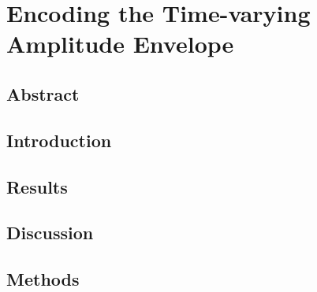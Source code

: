 \chapter{Encoding the Time-varying Amplitude Envelope}

\section{Abstract}

\section{Introduction}

\section{Results}

\section{Discussion}

\section{Methods}

